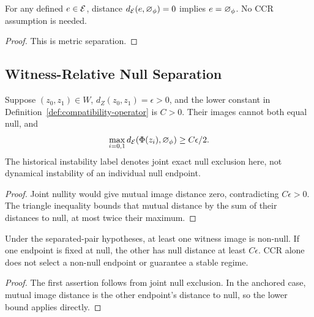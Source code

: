 \begin{lemma}\label{lem:null-bridge}
For any defined $e\in\mathcal{E}$, distance $d_{\mathcal{E}}(e,\varnothing_\phi)=0$ implies $e=\varnothing_\phi$. No CCR assumption is needed.
\end{lemma}
\begin{proof}
This is metric separation.
\end{proof}

\subsection{Witness-Relative Null Separation}
\begin{theorem}\label{thm:phenomenological-instability}
Suppose $(z_0,z_1)\in W$, $d_Z(z_0,z_1)=\epsilon>0$, and the lower constant in Definition~\ref{def:compatibility-operator} is $C>0$. Their images cannot both equal null, and
\[
\max_{i=0,1}d_{\mathcal{E}}(\Phi(z_i),\varnothing_\phi)\geq C\epsilon/2.
\]
The historical instability label denotes joint exact null exclusion here, not dynamical instability of an individual null endpoint.
\end{theorem}
\begin{proof}
Joint nullity would give mutual image distance zero, contradicting $C\epsilon>0$. The triangle inequality bounds that mutual distance by the sum of their distances to null, at most twice their maximum.
\end{proof}

\begin{corollary}\label{cor:forced-non-nullity}
Under the separated-pair hypotheses, at least one witness image is non-null. If one endpoint is fixed at null, the other has null distance at least $C\epsilon$. CCR alone does not select a non-null endpoint or guarantee a stable regime.
\end{corollary}
\begin{proof}
The first assertion follows from joint null exclusion. In the anchored case, mutual image distance is the other endpoint's distance to null, so the lower bound applies directly.
\end{proof}

